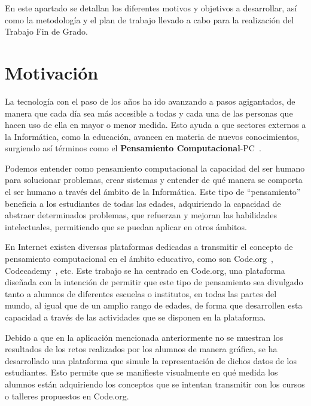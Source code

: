 
En este apartado se detallan los diferentes motivos y objetivos a desarrollar, así como la metodología y el plan de trabajo llevado a cabo para la realización del Trabajo Fin de Grado.

\section{Motivación}
\label{1:sec:1}

La tecnología con el paso de los años ha ido avanzando a pasos agigantados, de manera que cada día sea más accesible a todas y cada una de las personas que hacen uso de ella en mayor o menor medida. Esto ayuda a que sectores externos a la Informática, como la educación, avancen en materia de nuevos conocimientos,
surgiendo así términos como el \textbf{Pensamiento Computacional}-PC~\cite{M.Wing2006}.

Podemos entender como pensamiento computacional la capacidad del ser humano para solucionar problemas, crear sistemas y entender de qué manera se comporta el ser humano a través del ámbito de la Informática. Este tipo de ``pensamiento'' beneficia a los estudiantes de todas las edades, adquiriendo la capacidad de abstraer determinados
problemas, que refuerzan y mejoran las habilidades intelectuales, permitiendo que se puedan aplicar en otros ámbitos.

En Internet existen diversas plataformas dedicadas a transmitir el concepto de pensamiento computacional en el ámbito educativo, como son Code.org~\cite{Code.org}, Codecademy~\cite{Codecademy}, etc. Este trabajo se ha centrado en Code.org, una plataforma diseñada con la intención de permitir que este tipo de pensamiento sea divulgado tanto a alumnos de diferentes
escuelas o institutos, en todas las partes del mundo, al igual que de un amplio rango de edades, de forma que desarrollen esta capacidad a través de las actividades que se disponen en la plataforma.

Debido a que en la aplicación mencionada anteriormente no se muestran los resultados de los retos realizados por los alumnos de manera gráfica, se ha desarrollado una plataforma que simule la representación de dichos datos de los estudiantes. Esto permite que se manifieste visualmente en qué medida los alumnos están adquiriendo los conceptos
que se intentan transmitir con los cursos o talleres propuestos en Code.org. 

